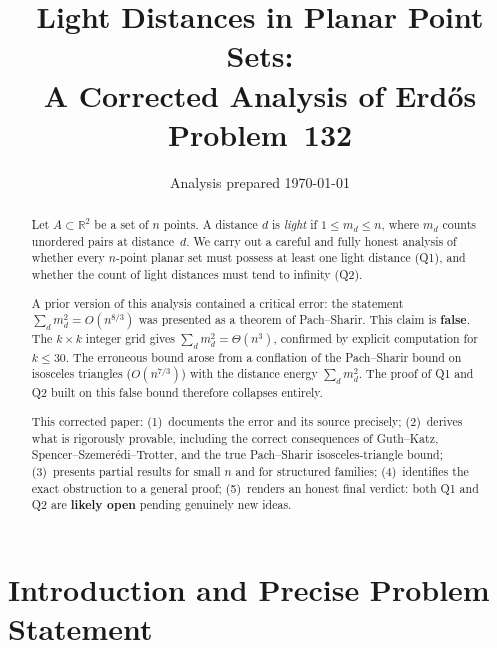 \documentclass[12pt,a4paper]{amsart}
\theoremstyle{plain}
\theoremstyle{definition}
\newcommand{\R}{\mathbb{R}}
\begin{document}

\title[Light Distances in Planar Point Sets]
{Light Distances in Planar Point Sets:\\
A Corrected Analysis of Erd\H{o}s Problem~132}

\author{Analysis prepared \today}
\date{}

\begin{abstract}
Let $A \subset \R^2$ be a set of $n$ points.
A distance $d$ is \emph{light} if $1 \le m_d \le n$, where $m_d$ counts
unordered pairs at distance~$d$.
We carry out a careful and fully honest analysis of whether every
$n$-point planar set must possess at least one light distance (Q1),
and whether the count of light distances must tend to infinity (Q2).

\medskip
A prior version of this analysis contained a critical error:
the statement $\sum_d m_d^2 = O(n^{8/3})$ was presented as a theorem
of Pach--Sharir.  This claim is \textbf{false}.
The $k \times k$ integer grid gives $\sum_d m_d^2 = \Theta(n^3)$,
confirmed by explicit computation for $k \le 30$.
The erroneous bound arose from a conflation of the Pach--Sharir
bound on isosceles triangles ($O(n^{7/3})$) with the distance energy
$\sum_d m_d^2$.  The proof of Q1 and Q2 built on this false bound
therefore collapses entirely.

\medskip
This corrected paper:
(1)~documents the error and its source precisely;
(2)~derives what is rigorously provable, including the correct
    consequences of Guth--Katz, Spencer--Szemer\'edi--Trotter, and
    the true Pach--Sharir isosceles-triangle bound;
(3)~presents partial results for small $n$ and for structured families;
(4)~identifies the exact obstruction to a general proof;
(5)~renders an honest final verdict: both Q1 and Q2 are
    \textbf{likely open} pending genuinely new ideas.
\end{abstract}

\maketitle
\tableofcontents

\section{Introduction and Precise Problem Statement}
\label{sec:intro}
\end{document}
